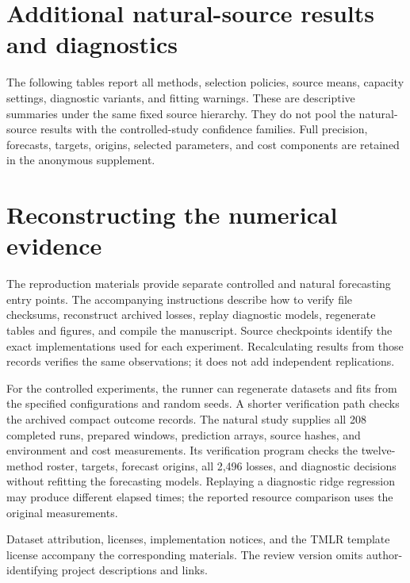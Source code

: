 


\section{Additional natural-source results and diagnostics}\label{app:full-results}
The following tables report all methods, selection policies, source
means, capacity settings, diagnostic variants, and fitting warnings.
These are descriptive summaries under the same fixed source hierarchy.
They do not pool the natural-source results with the controlled-study
confidence families. Full precision, forecasts, targets, origins, selected
parameters, and cost components are retained in the anonymous supplement.




\FloatBarrier




\section{Reconstructing the numerical evidence}\label{app:reproduction}
The reproduction materials provide separate controlled and natural
forecasting entry points. The accompanying instructions describe how
to verify file checksums, reconstruct archived losses, replay diagnostic
models, regenerate tables and figures, and compile the manuscript.
Source checkpoints identify the exact implementations used for each
experiment. Recalculating results from those records verifies the same
observations; it does not add independent replications.

For the controlled experiments, the runner can regenerate datasets and
fits from the specified configurations and random seeds. A shorter
verification path checks the archived compact outcome records. The
natural study supplies all 208 completed runs, prepared windows,
prediction arrays, source hashes, and environment and cost measurements.
Its verification program checks the twelve-method roster, targets,
forecast origins, all 2,496 losses, and diagnostic decisions without
refitting the forecasting models. Replaying a diagnostic ridge regression
may produce different elapsed times; the reported resource comparison
uses the original measurements.

Dataset attribution, licenses, implementation notices, and the TMLR
template license accompany the corresponding materials. The review
version omits author-identifying project descriptions and links.
